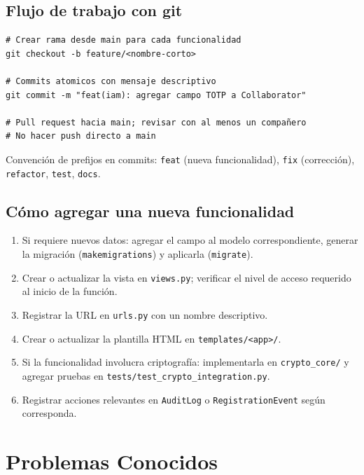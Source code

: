 \documentclass[10pt,letterpaper]{report}
\begin{document}
\section{Flujo de trabajo con git}

\begin{lstlisting}
# Crear rama desde main para cada funcionalidad
git checkout -b feature/<nombre-corto>

# Commits atomicos con mensaje descriptivo
git commit -m "feat(iam): agregar campo TOTP a Collaborator"

# Pull request hacia main; revisar con al menos un compañero
# No hacer push directo a main
\end{lstlisting}

Convención de prefijos en commits: \texttt{feat} (nueva funcionalidad), \texttt{fix} (corrección), \texttt{refactor}, \texttt{test}, \texttt{docs}.

\section{Cómo agregar una nueva funcionalidad}

\begin{enumerate}[leftmargin=*]
    \item Si requiere nuevos datos: agregar el campo al modelo correspondiente, generar la migración (\texttt{makemigrations}) y aplicarla (\texttt{migrate}).
    \item Crear o actualizar la vista en \texttt{views.py}; verificar el nivel de acceso requerido al inicio de la función.
    \item Registrar la URL en \texttt{urls.py} con un nombre descriptivo.
    \item Crear o actualizar la plantilla HTML en \texttt{templates/<app>/}.
    \item Si la funcionalidad involucra criptografía: implementarla en \texttt{crypto\_core/} y agregar pruebas en \texttt{tests/test\_crypto\_integration.py}.
    \item Registrar acciones relevantes en \texttt{AuditLog} o \texttt{RegistrationEvent} según corresponda.
\end{enumerate}

\chapter{Problemas Conocidos}
\end{document}
